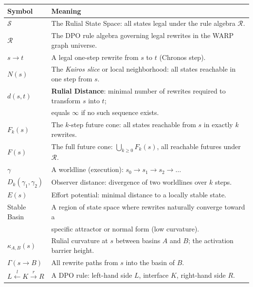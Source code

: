 \begin{center}
\begin{tabularx}{\linewidth}{@{}lX@{}}
\toprule
\textbf{Symbol} & \textbf{Meaning} \\
\midrule

$\mathcal{S}$ & The Rulial State Space: all states legal under the rule algebra $\mathcal{R}$. \\[2pt]

$\mathcal{R}$ & The DPO rule algebra governing legal rewrites in the WARP graph universe. \\[2pt]

$s \to t$ & A legal one-step rewrite from $s$ to $t$ (Chronos step). \\[2pt]

$N(s)$ & The \emph{Kairos slice} or local neighborhood: all states reachable in one step from $s$. \\[2pt]

$d(s,t)$ & \textbf{Rulial Distance}: minimal number of rewrites required to transform $s$ into $t$; \\ 
         & equals $\infty$ if no such sequence exists. \\[2pt]

$F_k(s)$ & The $k$-step future cone: all states reachable from $s$ in exactly $k$ rewrites. \\[2pt]

$F(s)$ & The full future cone: $\bigcup_{k \ge 0} F_k(s)$, all reachable futures under $\mathcal{R}$. \\[2pt]

$\gamma$ & A worldline (execution): $s_0 \to s_1 \to s_2 \to \dots$ \\[2pt]

$D_k(\gamma_1, \gamma_2)$ & Observer distance: divergence of two worldlines over $k$ steps. \\[2pt]

$E(s)$ & Effort potential: minimal distance to a locally stable state. \\[2pt]

Stable Basin & A region of state space where rewrites naturally converge toward a \\
            & specific attractor or normal form (low curvature). \\[2pt]

$\kappa_{A,B}(s)$ & Rulial curvature at $s$ between basins $A$ and $B$; the activation barrier height. \\[2pt]

$\Gamma(s \to B)$ & All rewrite paths from $s$ into the basin of $B$. \\[2pt]

$L \xleftarrow{l} K \xrightarrow{r} R$ & A DPO rule: left-hand side $L$, interface $K$, right-hand side $R$. \\[2pt]

\bottomrule
\end{tabularx}
\end{center}

\vspace{1em}
